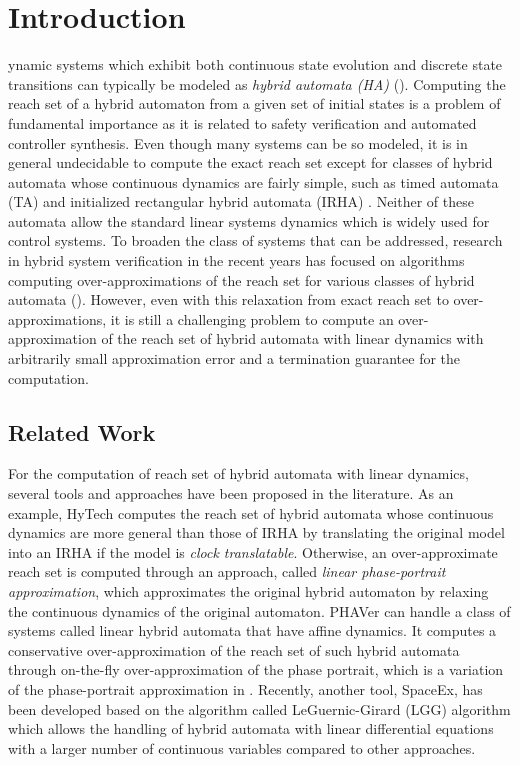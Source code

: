 
\section{Introduction} \label{sec:intro}

 {ynamic} systems which exhibit both continuous state evolution and discrete state transitions can typically be modeled as {\em hybrid automata (HA)} (\cite{henzinger:96, lynch:03}).
Computing the reach set of a hybrid automaton from a given set of initial states is a problem of fundamental importance as it is related to safety verification and automated controller synthesis.
Even though many systems can be so modeled, it is in general undecidable to compute the exact reach set \cite{henzinger:95} except for classes of hybrid automata whose continuous dynamics are fairly simple, such as timed automata (TA) \cite{alur:94} and initialized rectangular hybrid automata (IRHA) \cite{henzinger:95}.
Neither of these automata allow the standard linear systems dynamics which is widely used for control systems. 
To broaden the class of systems that can be addressed, research in hybrid system verification in the recent years has focused on algorithms computing over-approximations of the reach set for various classes of hybrid automata (\cite{henzinger:97, frehse:08, chutinan:03, girard:05, asarin:00, kurzh:00, clarke:03, tiwari:02}).
However, even with this relaxation from exact reach set to over-approximations, it is still a challenging problem to compute an over-approximation of the reach set of hybrid automata with linear dynamics with arbitrarily small approximation error and a termination guarantee for the computation.


\subsection{Related Work}
For the computation of reach set of hybrid automata with linear dynamics, several tools and approaches have been proposed in the literature.
As an example, HyTech \cite{henzinger:97} computes the reach set of hybrid automata whose continuous dynamics are more general than those of IRHA by translating the original model into an IRHA if the model is {\em clock translatable}.
Otherwise, an over-approximate reach set is computed through an approach, called {\em linear phase-portrait approximation}, which approximates the original hybrid automaton by relaxing the continuous dynamics of the original automaton.
PHAVer \cite{frehse:08} can handle a class of systems called linear hybrid automata that have affine dynamics. 
It computes a conservative over-approximation of the reach set of such hybrid automata through on-the-fly over-approximation of the phase portrait, which is a variation of the phase-portrait approximation in \cite{henzinger:97}.
Recently, another tool, SpaceEx, has been developed based on the algorithm called LeGuernic-Girard (LGG) algorithm \cite{guernic:10} which allows the handling of hybrid automata with linear differential equations with a larger number of continuous variables compared to other approaches.

